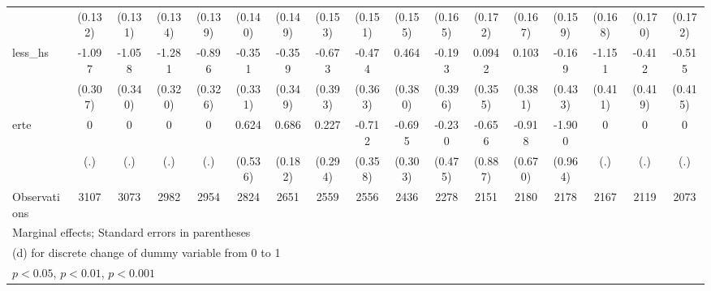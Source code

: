 {\begin{tabular}{l*{16}{c}}
                    &     (0.132)         &     (0.131)         &     (0.134)         &     (0.139)         &     (0.140)         &     (0.149)         &     (0.153)         &     (0.151)         &     (0.155)         &     (0.165)         &     (0.172)         &     (0.167)         &     (0.159)         &     (0.168)         &     (0.170)         &     (0.172)         \\
[1em]
less\_hs             &      -1.097\sym{***}&      -1.058\sym{**} &      -1.281\sym{***}&      -0.896\sym{**} &      -0.351         &      -0.359         &      -0.673         &      -0.474         &       0.464         &      -0.193         &      0.0942         &       0.103         &      -0.169         &      -1.151\sym{**} &      -0.412         &      -0.515         \\
                    &     (0.307)         &     (0.340)         &     (0.320)         &     (0.326)         &     (0.331)         &     (0.349)         &     (0.393)         &     (0.363)         &     (0.380)         &     (0.396)         &     (0.355)         &     (0.381)         &     (0.433)         &     (0.411)         &     (0.419)         &     (0.415)         \\
[1em]
erte                &           0         &           0         &           0         &           0         &       0.624         &       0.686\sym{***}&       0.227         &      -0.712\sym{*}  &      -0.695\sym{*}  &      -0.230         &      -0.656         &      -0.918         &      -1.900\sym{*}  &           0         &           0         &           0         \\
                    &         (.)         &         (.)         &         (.)         &         (.)         &     (0.536)         &     (0.182)         &     (0.294)         &     (0.358)         &     (0.303)         &     (0.475)         &     (0.887)         &     (0.670)         &     (0.964)         &         (.)         &         (.)         &         (.)         \\
\hline
Observations        &        3107         &        3073         &        2982         &        2954         &        2824         &        2651         &        2559         &        2556         &        2436         &        2278         &        2151         &        2180         &        2178         &        2167         &        2119         &        2073         \\
\hline\hline
\multicolumn{17}{l}{\footnotesize Marginal effects; Standard errors in parentheses}\\
\multicolumn{17}{l}{\footnotesize  (d) for discrete change of dummy variable from 0 to 1}\\
\multicolumn{17}{l}{\footnotesize \sym{*} \(p<0.05\), \sym{**} \(p<0.01\), \sym{***} \(p<0.001\)}\\
\end{tabular}
}
